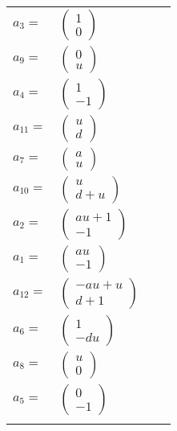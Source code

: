 \documentclass[1p]{elsarticle_modified}
\theoremstyle{definition}
\begin{document}
\begin{tabular}{m{7pt} m{180pt} m{7pt} m{180pt} }
\flushright $a_{3}=$&$\begin{pmatrix}1\\0\end{pmatrix}$ \\
\flushright $a_{9}=$&$\begin{pmatrix}0\\u\end{pmatrix}$ \\
\flushright $a_{4}=$&$\begin{pmatrix}1\\-1\end{pmatrix}$ \\
\flushright $a_{11}=$&$\begin{pmatrix}u\\d\end{pmatrix}$ \\
\flushright $a_{7}=$&$\begin{pmatrix}a\\u\end{pmatrix}$ \\
\flushright $a_{10}=$&$\begin{pmatrix}u\\d+u\end{pmatrix}$ \\
\flushright $a_{2}=$&$\begin{pmatrix}a u+1\\-1\end{pmatrix}$ \\
\flushright $a_{1}=$&$\begin{pmatrix}a u\\-1\end{pmatrix}$ \\
\flushright $a_{12}=$&$\begin{pmatrix}- a u+u\\d+1\end{pmatrix}$ \\
\flushright $a_{6}=$&$\begin{pmatrix}1\\- d u\end{pmatrix}$ \\
\flushright $a_{8}=$&$\begin{pmatrix}u\\0\end{pmatrix}$ \\
\flushright $a_{5}=$&$\begin{pmatrix}0\\-1\end{pmatrix}$\\&\end{tabular}
\end{document}
